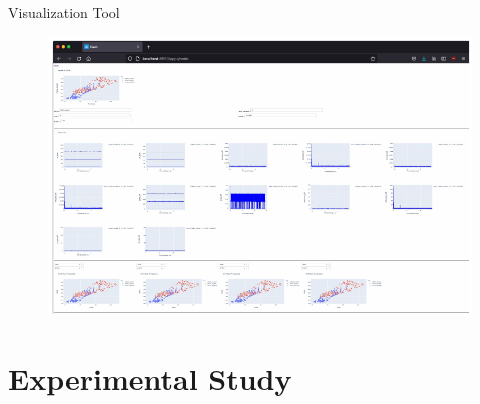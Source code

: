 \documentclass[notes=only,10pt,xcolor=table]{beamer}
\begin{document}
\begin{frame}{Visualization Tool}
\begin{figure}
    \includegraphics[width=1\textwidth]{img/python_dash_fig.pdf}
\end{figure}
\end{frame}

\section{Experimental Study}
\end{document}
